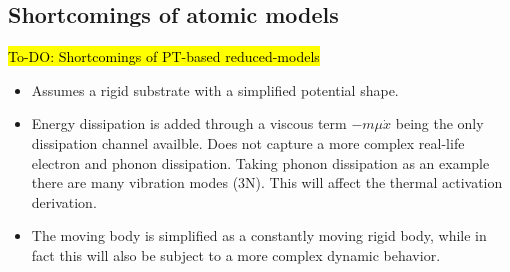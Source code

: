 



\subsection{Shortcomings of atomic models}
\hl{To-DO: Shortcomings of PT-based reduced-models} %
\begin{itemize}
  \item Assumes a rigid substrate with a simplified potential shape. 
  \item Energy dissipation is added through a viscous term $-m\mu \dot{x}$ being the only dissipation channel availble. Does not capture a more complex real-life electron and phonon dissipation. Taking phonon dissipation as an example there are many vibration modes (3N). This will affect the thermal activation derivation. 
  \item The moving body is simplified as a constantly moving rigid body, while in fact this will also be subject to a more complex dynamic behavior.
\end{itemize}






